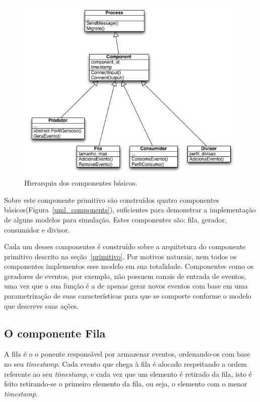 \begin{figure}
  \centerline{\includegraphics{uml_componentes.png}}
  \caption{Hierarquia dos componentes básicos.}
\label{fig:uml_components}
\end{figure}

Sobre este componente primitivo são construídos quatro componentes básicos(Figura~\ref{uml_components}), suficientes para demonstrar a implementação de alguns modelos para simulação. Estes componentes são: fila, gerador, consumidor e divisor.

Cada um desses componentes é construído sobre a arquitetura do componente primitivo descrito na seção~\ref{primitivo}. Por motivos naturais, nem todos os componentes implementos esse modelo em sua totalidade. Componentes como os geradores de eventos, por exemplo, não possuem canais de entrada de eventos, uma vez que a sua função é a de apenas gerar novos eventos com base em uma parametrização de suas características para que se comporte conforme o modelo que descreve suas ações. 

\subsection{O componente Fila}

A fila é o o ponente responsável por armazenar eventos, ordenando-os com base no seu \textit{timestamp}. Cada evento que chega à fila é alocado respeitando a ordem referente ao seu \textit{timestamp}, e cada vez que um elemento é retirado da fila, isto é feito retirando-se o primeiro elemento da fila, ou seja, o elemento com o menor \textit{timestamp}. 

